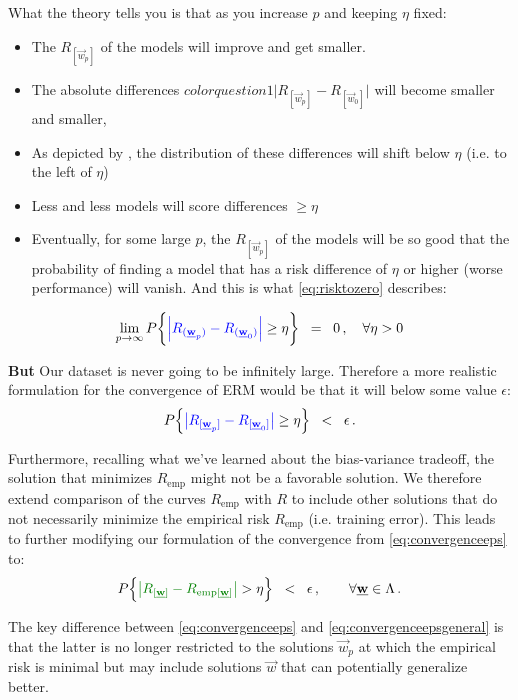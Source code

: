 {\begin{itemize}
			What the theory tells you is that as you increase $p$ and keeping $\eta$ fixed:
			\begin{itemize}
				\item The $R_{[\vec w_p]}$ of the models will improve and get smaller.
				\item The absolute differences ${color{question1}\Big|R_{[\vec w_p]} - R_{[\vec w_0]}\Big|}$ will become smaller and smaller,
				\item As depicted by , the distribution of these differences will shift below $\eta$ (i.e. to the left of $\eta$)
				\item Less and less models will score differences $\ge \eta$
				\item Eventually, for some large $p$, the $R_{[\vec w_p]}$ of the models will be so good that the probability of finding a model that has a risk difference of $\eta$ or higher (worse performance) will vanish. And this is what \eqref{eq:risktozero} describes:
			\end{itemize}
			\end{itemize}
			\begin{equation}
				\lim_{p \to \infty} P\bigg\{ 
					{\color{question1}
						\Big|R_{(\vec w_p)} - R_{(\vec w_0)}\Big| 
					}
				\geq \eta \bigg\}\;\;=\;\; 0 \,, \quad \forall \eta > 0
				\label{eq:risktozero}
			\end{equation}
			
			\textbf{But} Our dataset is never going to be infinitely large. Therefore a more realistic formulation for the convergence of ERM would be that it will below some value $\epsilon$:
			\begin{equation}
					P \Big\{ {\color{question1} 
							\big| R_{[\vec{w}_p]} - R_{[\vec{w}_0]} \big| 
						} \geq \eta \Big\} \;\;<\;\; \epsilon \,.
						\label{eq:convergenceeps}
				\end{equation}
				
			Furthermore, recalling what we've learned about the bias-variance tradeoff, the solution that minimizes $R_{\text{emp}}$ might not be a favorable solution. We therefore extend comparison of the curves $R_{\text{emp}}$ with $R$ to include other solutions that do not necessarily minimize the empirical risk $R_{\text{emp}}$ (i.e. training error). This leads to further modifying our formulation of the convergence from \eqref{eq:convergenceeps} to:
				\begin{equation}
					P \Big\{ {\color{question2}
							\big| R_{[\vec w]} - R_{\mathrm{emp}[\vec w]} \big|
						} > \eta \Big\} \;\;<\;\; \epsilon \,, 
						\qquad \forall \vec w \in \Lambda \,.
						\label{eq:convergenceepsgeneral}
				\end{equation}
			
			The key difference between \eqref{eq:convergenceeps} and \eqref{eq:convergenceepsgeneral} is that the latter is no longer restricted to the solutions $\vec w_p$ at which the empirical risk is minimal but may include solutions $\vec w$ that can potentially generalize better.
}

